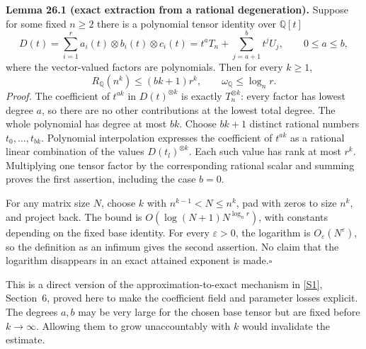 \documentclass[11pt,a4paper]{article}
\newcommand{\Q}{\mathbb{Q}}
\newcommand{\sref}[2]{\hyperlink{source:#1:#2}{[S#2]}}
\numberwithin{equation}{section}
\begin{document}
\textbf{Lemma 26.1 (exact extraction from a rational degeneration).}
Suppose for some fixed $n\ge2$ there is a polynomial tensor identity over
$\Q[t]$
\begin{equation}\label{r26:degeneration}
 D(t)=\sum_{i=1}^{r}a_i(t)\otimes b_i(t)\otimes c_i(t)
          =t^aT_n+\sum_{j=a+1}^{b}t^jU_j,
          \qquad 0\le a\le b,
\end{equation}
where the vector-valued factors are polynomials. Then for every $k\ge1$,
\begin{equation}\label{r26:exact}
       R_{\Q}(n^k)\le(bk+1)r^k,
       \qquad \omega_{\Q}\le\log_n r.
\end{equation}
\emph{Proof.} The coefficient of $t^{ak}$ in $D(t)^{\otimes k}$ is
exactly $T_n^{\otimes k}$: every factor has lowest degree $a$, so there
are no other contributions at the lowest total degree. The whole
polynomial has degree at most $bk$. Choose $bk+1$ distinct rational
numbers $t_0,\ldots,t_{bk}$. Polynomial interpolation expresses the
coefficient of $t^{ak}$ as a rational linear combination of the values
$D(t_l)^{\otimes k}$. Each such value has rank at most $r^k$.
Multiplying one tensor factor by the corresponding rational scalar and
summing proves the first assertion, including the case $b=0$.

For any matrix size $N$, choose $k$ with $n^{k-1}<N\le n^k$, pad with
zeros to size $n^k$, and project back. The bound is
$O(\log(N+1)N^{\log_n r})$, with constants depending on the fixed base
identity. For every $\varepsilon>0$, the logarithm is
$O_\varepsilon(N^\varepsilon)$, so the definition as an infimum gives
the second assertion. No claim that the logarithm disappears in an
exact attained exponent is made.\hfill$\square$

This is a direct version of the approximation-to-exact mechanism in
\sref{statement}{1}, Section~6, proved here to make the coefficient field and
parameter losses explicit. The degrees $a,b$ may be very large for the
chosen base tensor but are fixed before $k\to\infty$. Allowing them to
grow unaccountably with $k$ would invalidate the estimate.
\end{document}
